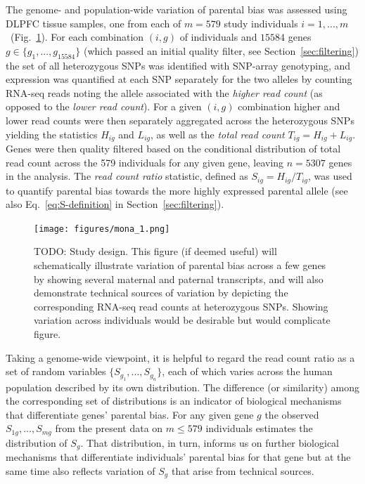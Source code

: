 \documentclass[letterpaper]{article}
\begin{document}
The genome- and population-wide variation of parental bias was assessed using
DLPFC tissue samples, one from each of \(m=579\) study individuals
\(i=1,...,m\)~(Fig.~\ref{fig:study-design}).
For each combination \((i,g)\) of individuals and \(15584\) genes
\(g\in\{g_1,...,g_{15584}\}\) (which passed an initial quality filter, see
Section~\ref{sec:filtering}) the set
of all heterozygous SNPs was identified with SNP-array genotyping, and
expression was quantified at each SNP separately for the two alleles by
counting RNA-seq reads noting the allele associated with the \emph{higher read
count} (as opposed to the \emph{lower read count}).  For a given \((i,g)\)
combination higher and lower read counts were then separately aggregated
across the heterozygous SNPs yielding the statistics \(H_{ig}\) and
\(L_{ig}\), as well as the \emph{total read count} \(T_{ig} = H_{ig} +
L_{ig}\).  Genes were then quality filtered based on the conditional
distribution of total read count across the 579 individuals for any given
gene, leaving \(n=5307\) genes in the analysis.  The \emph{read count ratio}
statistic, defined as \(S_{ig} = H_{ig}/T_{ig}\), was used to quantify
parental bias towards the more highly expressed parental allele (see also
Eq.~\ref{eq:S-definition} in Section~\ref{sec:filtering}).

\begin{figure}
\begin{center}
\texttt{[image: figures/mona\_1.png]}
\end{center}
\caption{TODO: Study design.  This figure (if deemed useful) will
schematically illustrate variation of parental bias across a few genes by
showing several maternal and paternal transcripts, and will also demonstrate
technical sources of variation by depicting
the corresponding RNA-seq read counts at heterozygous SNPs.  Showing variation across
individuals would be desirable but would complicate figure.}
\label{fig:study-design}
\end{figure}


Taking a genome-wide viewpoint, it is helpful to regard the read count ratio
as a set of random variables \(\{S_{g_1},...,S_{g_n}\}\), each of which varies
across the human population described by its own distribution.  The difference
(or similarity) among the corresponding set of distributions is an indicator
of biological mechanisms that differentiate genes' parental bias.  For any
given gene \(g\) the observed \(S_{1g},...,S_{mg}\) from the present data on
\(m\le579\) individuals estimates the distribution of \(S_g\).  That
distribution, in turn, informs us on further biological mechanisms that
differentiate individuals' parental bias for that gene but at the same time
also reflects variation of \(S_g\) that arise from technical sources.
\end{document}
